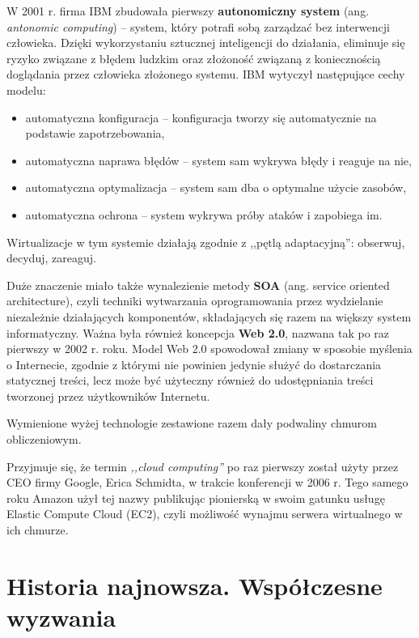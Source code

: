 \documentclass[12pt,a4paper,twoside,titlepage,openright]{book}
\begin{document}
W 2001 r. firma IBM zbudowała pierwszy \textbf{autonomiczny system} (ang. \textit{antonomic computing}) -- system, który potrafi sobą zarządzać bez interwencji człowieka. Dzięki wykorzystaniu sztucznej inteligencji do działania, eliminuje się ryzyko związane z błędem ludzkim oraz złożoność związaną z koniecznością doglądania przez człowieka złożonego systemu. IBM wytyczył następujące cechy modelu:
\begin{itemize}
\item automatyczna konfiguracja -- konfiguracja tworzy się automatycznie na podstawie zapotrzebowania,
\item automatyczna naprawa błędów -- system sam wykrywa błędy i reaguje na nie,
\item automatyczna optymalizacja -- system sam dba o optymalne użycie zasobów,
\item automatyczna ochrona -- system wykrywa próby ataków i zapobiega im.
\end{itemize}
Wirtualizacje w tym systemie działają zgodnie z ,,pętlą adaptacyjną'': obserwuj, decyduj, zareaguj.\cite{ccSpringer}


Duże znaczenie miało także wynalezienie metody \textbf{SOA} (ang. service oriented architecture), czyli techniki wytwarzania oprogramowania przez wydzielanie niezależnie działających komponentów, składających się razem na większy system informatyczny. Ważna była również koncepcja \textbf{Web 2.0}, nazwana tak po raz pierwszy w 2002 r. roku. Model Web 2.0 spowodował zmiany w sposobie myślenia o Internecie, zgodnie z którymi nie powinien jedynie służyć do dostarczania statycznej treści, lecz może być użyteczny również do udostępniania treści tworzonej przez użytkowników Internetu.

Wymienione wyżej technologie zestawione razem dały podwaliny chmurom obliczeniowym.

Przyjmuje się, że termin \textit{,,cloud computing''} po raz pierwszy został użyty przez CEO firmy Google, Erica Schmidta, w trakcie konferencji w 2006 r. Tego samego roku Amazon użył tej nazwy publikując pionierską w swoim gatunku usługę Elastic Compute Cloud (EC2), czyli możliwość wynajmu serwera wirtualnego w ich chmurze.

\section{Historia najnowsza. Współczesne wyzwania}
\end{document}
